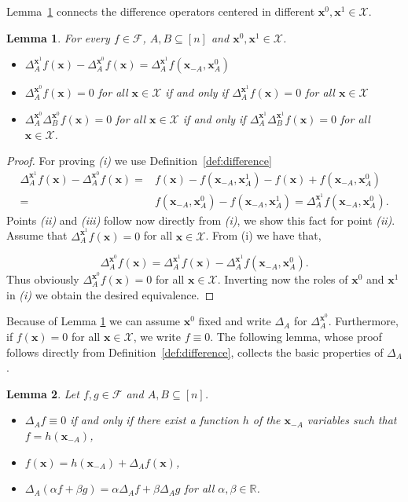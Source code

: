 \documentclass[11pt,a4paper, twoside]{book}
\newtheorem{lemma}{Lemma}[chapter]
\newcommand{\bx}{\mathbf{x}}
\newcommand{\bchi}{\boldsymbol{\mathcal{X}}}
\begin{document}
Lemma~\ref{lem:x0x1} connects the difference operators centered in different $\bx^0, \bx^1 \in \bchi$.
\begin{lemma}
\label{lem:x0x1}
For every $f \in \mathcal{F}$, $A,B \subseteq [n]$ and $\bx^{0}, \bx^{1} \in \bchi$.
\begin{itemize}
\item[(i)] $\Delta^{\bx^1}_{A}f(\bx)-  \Delta^{\bx^0}_{A}f(\bx) = \Delta^{\bx^1}_{A}f(\bx_{-A}, \bx^0_{A})$
\item[(ii)]  $\Delta^{\bx^0}_{A}f(\bx) = 0 $ for all $\bx \in \bchi $ if and only if $ \Delta^{\bx^1}_{A}f(\bx) = 0 $ for all $\bx \in \bchi $
\item[(iii)] $ \Delta^{\bx^0}_{A}\Delta^{\bx^0}_{B}f(\bx) = 0 $ for all $\bx \in \bchi $ if and only if $ \Delta^{\bx^1}_{A}\Delta^{\bx^1}_{B}f(\bx) = 0 $ for all $\bx \in \bchi $.
\end{itemize} 
\end{lemma}

\begin{proof} For proving \textit{(i)} we use Definition~\ref{def:difference}
\begin{align*}
\Delta^{\bx^1}_{A}f(\bx)-\Delta^{\bx^0}_{A}f(\bx) = &f(\bx) - f(\bx_{-A},\bx_{A}^{1}) - f(\bx) + f(\bx_{-A},\bx_{A}^{0})  \\
 =&f(\bx_{-A},\bx_{A}^{0})- f(\bx_{-A},\bx_{A}^{1})    
 =\Delta_{A}^{\bx^1}f(\bx_{-A},\bx_A^{0}).
\end{align*}
Points \textit{(ii)} and \textit{(iii)} follow now directly from \textit{(i)}, we show this fact for point \textit{(ii)}.
Assume that $\Delta^{\bx^1}_Af(\bx) = 0$ for all $\bx \in \bchi$. From (i) we have that,

$$ \Delta_A^{\bx^0}f(\bx) =  \Delta_A^{\bx^1}f(\bx) - \Delta_A^{\bx^1}f(\bx_{-A},\bx^{0}_A).$$
Thus obviously $\Delta_A^{\bx^0}f(\bx) = 0$ for all $\bx \in \bchi$. Inverting now the roles of $\bx^{0}$ and $\bx^{1}$ in \textit{(i)} we obtain the desired equivalence.
\end{proof}

Because of Lemma \ref{lem:x0x1} we can assume $\bx^0$ fixed and write $\Delta_{A}$ for $\Delta^{\bx^0}_{A}$.
Furthermore, if $f(\bx)=0$ for all $\bx \in \bchi$, we write $f\equiv 0$.
The following lemma, whose proof follows directly from Definition~\ref{def:difference}, collects the basic properties of $\Delta_{A}$.
\begin{lemma}
\label{lem:first}
Let $f,g \in \mathcal{F}$  and $A,B \subseteq[n]$.

\begin{itemize}
\item[(i)] $\Delta_{A}f \equiv 0$ if and only if there exist a function $h$ of the $\bx_{-A}$ variables such that $f = h(\bx_{-A})$,
\item[(ii)]  $f(\bx)=h(\bx_{-A}) + \Delta_Af(\bx)$,
\item[(iii)] $\Delta_{A}(\alpha f+\beta g) = \alpha \Delta_{A}f + \beta\Delta_{A}g$ for all $\alpha,\beta \in \mathbb{R}$. 
\end{itemize} 
\end{lemma}
\end{document}
